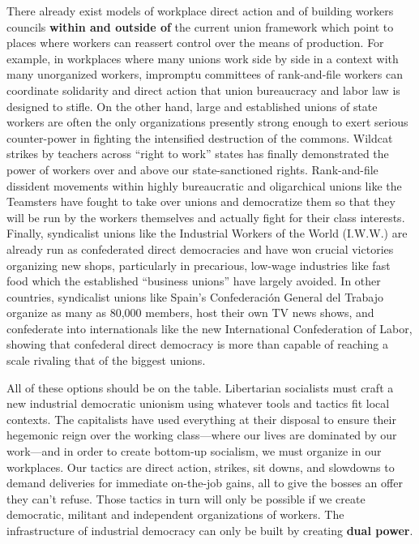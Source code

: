 \documentclass[10pt]{memoir}
\def \href #1#2{#2} %
\begin{document}
There already exist models of workplace direct action and of building
workers councils \textbf{within and outside of} the current union
framework which point to places where workers can reassert control over
the means of production. For example, in workplaces where many unions
work side by side in a context with many unorganized workers, impromptu
committees of rank-and-file workers can coordinate solidarity and direct
action that union bureaucracy and labor law is designed to stifle. On
the other hand, large and established unions of state workers are often
the only organizations presently strong enough to exert serious
counter-power in fighting the intensified destruction of the commons.
\href{https://dsa-lsc.org/2018/03/17/statement-in-solidarity-with-striking-teachers/}{Wildcat
strikes by teachers across ``right to work'' states has finally
demonstrated} the power of workers over and above our state-sanctioned
rights. Rank-and-file dissident movements within highly bureaucratic and
oligarchical unions like the Teamsters have
\href{https://www.jacobinmag.com/2018/10/ups-contract-rejection-james-hoffa-hybrid-drivers}{fought}
to take over unions and democratize them so that they will be run by the
workers themselves and actually fight for their class interests.
Finally, syndicalist unions like the Industrial Workers of the World
(I.W.W.) are already run as confederated direct democracies and have
\href{https://www.oregonlive.com/expo/erry-2018/05/2d74cccd872709/burgerville_fastfood_workers_u.html}{won
crucial victories organizing new shops}, particularly in precarious,
low-wage industries like fast food which the established ``business
unions'' have largely avoided. In other countries, syndicalist unions
like Spain's \href{http://cgt.org.es/}{Confederación General del
Trabajo} organize
\href{http://progressivespain.com/2018/01/08/profile-confederacion-general-del-trabajo-cgt-general-confederation-of-labour/}{as
many as 80,000 members}, host their own
\href{https://www.youtube.com/channel/UCAdtgt5slNceh_0z2dQqpLw}{TV news
shows}, and confederate into internationals like the new
\href{https://freedomnews.org.uk/founding-of-a-new-international/}{International
Confederation of Labor}, showing that confederal direct democracy is
more than capable of reaching a scale rivaling that of the biggest
unions.

All of these options should be on the table. Libertarian socialists must
craft a new industrial democratic unionism using whatever tools and
tactics fit local contexts. The capitalists have used everything at
their disposal to ensure their hegemonic reign over the working
class---where our lives are dominated by our work---and in order to
create bottom-up socialism, we must organize in our workplaces. Our
tactics are direct action, strikes, sit downs, and slowdowns to demand
deliveries for immediate on-the-job gains, all to give the bosses an
offer they can't refuse. Those tactics in turn will only be possible if
we create democratic, militant and independent organizations of workers.
The infrastructure of industrial democracy can only be built by creating
\textbf{dual power}.
\end{document}
